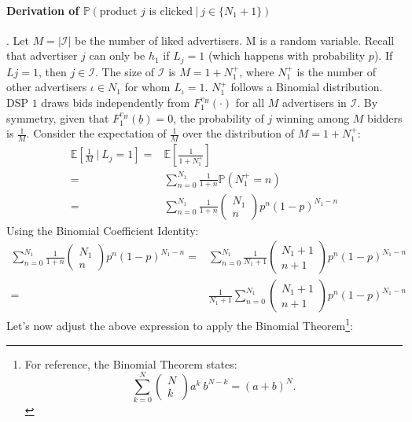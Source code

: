 \documentclass[11pt]{article}
\theoremstyle{plain}
\theoremstyle{definition}
\theoremstyle{plain}
\theoremstyle{plain}
\theoremstyle{plain}
\theoremstyle{plain}
\numberwithin{equation}{section}
\begin{document}
\paragraph{Derivation of $\mathbb{P}(\text{product } j \text{ is clicked} \ | \ j \in \{N_{1}+1\} )$}. Let $M = |\mathcal{I}|$ be the number of liked advertisers. M is a random variable. Recall that advertiser $j$ can only be $h_1$ if $L_j=1$ (which happens with probability $p$). If $Lj=1$, then $j \in \mathcal{I}$. The size of $\mathcal{I}$ is $M = 1 + N_1^+$, where $ N_1^+$ is the number of other advertisers $\iota \in N_1$ for whom $L_{\iota} = 1$. $ N_1^+$ follows a Binomial distribution. DSP $1$ draws bids independently from $F_1^{v_H}(\cdot)$ for all $M$ advertisers in $\mathcal{I}$. By symmetry, given that $F_1^{v_H}(\underline{b})=0$, the probability of $j$ winning among $M$ bidders is $\frac{1}{M}$. Consider the expectation of $\frac{1}{M}$ over the distribution of $M = 1 + N_1^+$:
\begin{align*}
    \mathbb{E}\left[\frac{1}{M} \ \bigg| \ L_j=1\right] = & \mathbb{E}\left[\frac{1}{1+N_1^+}\right] \\[5pt]
    = & \sum_{n=0}^{N_1} \frac{1}{1+n} \mathbb{P}(N_1^+ = n) \\[5pt]
    = & \sum_{n=0}^{N_1} \frac{1}{1+n} \begin{pmatrix}
        N_1 \\
        n
    \end{pmatrix} p^n (1-p)^{N_1-n}
\end{align*}
\noindent Using the Binomial Coefficient Identity: 
\begin{align*}
    \sum_{n=0}^{N_1} \frac{1}{1+n} \begin{pmatrix}
        N_1 \\
        n
    \end{pmatrix} p^n (1-p)^{N_1-n} = & \sum_{n=0}^{N_1} \frac{1}{N_1+1} \begin{pmatrix}
        N_1+1 \\
        n+1
    \end{pmatrix} p^n (1-p)^{N_1-n} \\[5pt]
    = & \frac{1}{N_1+1} \sum_{n=0}^{N_1} \begin{pmatrix}
        N_1+1 \\
        n+1
    \end{pmatrix} p^n (1-p)^{N_1-n}
\end{align*}
Let's now adjust the above expression to apply the Binomial Theorem\footnote{For reference, the Binomial Theorem states: \begin{equation*}
    \sum_{k=0}^{N} \begin{pmatrix}
    N \\ k
\end{pmatrix} a^k \ b^{N-k} = (a+b)^N.
\end{equation*}}:
\end{document}
